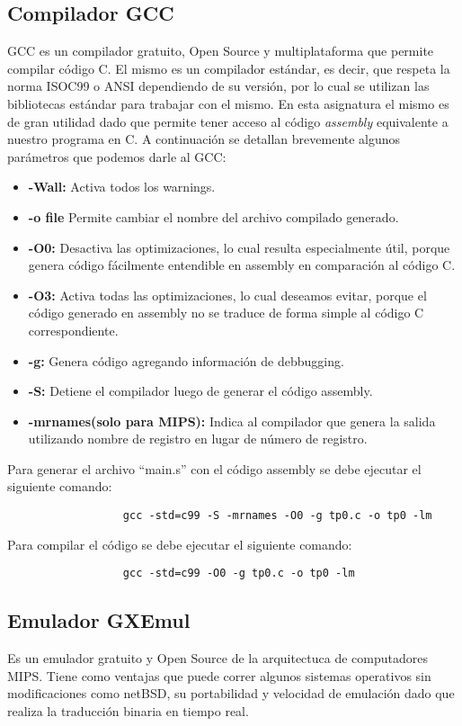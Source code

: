 	\subsection{Compilador GCC}
		GCC es un compilador gratuito, Open Source y multiplataforma que permite compilar código C. 
		El mismo es un compilador estándar, es decir, que respeta la norma ISOC99 o ANSI dependiendo de su versión, por lo cual se utilizan las 
		bibliotecas estándar para trabajar con el mismo. En esta asignatura el mismo es de gran utilidad dado que permite tener acceso  al código 
		\emph{assembly} equivalente a nuestro programa en C. A continuación se detallan brevemente algunos parámetros que podemos darle al GCC:
		\begin{itemize}
			\item \textbf{-Wall:} Activa todos los warnings.
			\item \textbf{-o file} Permite cambiar el nombre del archivo compilado generado.
			\item \textbf{-O0:} Desactiva las optimizaciones, lo cual resulta especialmente útil, porque genera código fácilmente entendible en 
			assembly en comparación al código C.
			\item \textbf{-O3:} Activa todas las optimizaciones, lo cual deseamos evitar, porque el código generado en assembly no se traduce de
			forma simple al código C correspondiente.
			\item \textbf{-g:} Genera código agregando información de debbugging.
			\item \textbf{-S:} Detiene el compilador luego de generar el código assembly.
			\item \textbf{-mrnames(solo para MIPS):} Indica al compilador que genera la salida utilizando nombre de registro en lugar de número de registro.
		\end{itemize}
		Para generar el archivo ``main.s'' con el código assembly se debe ejecutar el siguiente comando: 
		  \begin{verbatim}
			      gcc -std=c99 -S -mrnames -O0 -g tp0.c -o tp0 -lm
		  \end{verbatim}
		Para compilar el código se debe ejecutar el siguiente comando:
		\begin{verbatim}
			      gcc -std=c99 -O0 -g tp0.c -o tp0 -lm
		 \end{verbatim}
		\vspace{0.5cm}
		
	\subsection{Emulador GXEmul}
		Es un emulador gratuito y Open Source de la arquitectuca de computadores MIPS. Tiene como ventajas que puede correr algunos sistemas operativos
		sin modificaciones como netBSD, su portabilidad y velocidad de emulación dado que realiza la traducción binaria en tiempo real. 
		\vspace{0.5cm}
		

